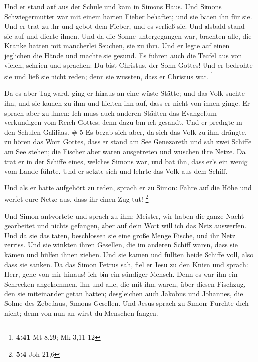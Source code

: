  Und er stand auf aus der Schule und kam in Simons Haus.
Und Simons Schwiegermutter war mit einem harten Fieber behaftet; und sie
baten ihn für sie.  Und er trat zu ihr und gebot dem
Fieber, und es verließ sie. Und alsbald stand sie auf und diente ihnen.
 Und da die Sonne untergegangen war, brachten alle, die
Kranke hatten mit mancherlei Seuchen, sie zu ihm. Und er legte auf einen
jeglichen die Hände und machte sie gesund.  Es fuhren
auch die Teufel aus von vielen, schrien und sprachen: Du bist Christus,
der Sohn Gottes! Und er bedrohte sie und ließ sie nicht reden; denn sie
wussten, dass er Christus war. \footnote{\textbf{4:41} Mt 8,29; Mk
  3,11-12}

 Da es aber Tag ward, ging er hinaus an eine wüste
Stätte; und das Volk suchte ihn, und sie kamen zu ihm und hielten ihn
auf, dass er nicht von ihnen ginge.  Er sprach aber zu
ihnen: Ich muss auch anderen Städten das Evangelium verkündigen vom
Reich Gottes; denn dazu bin ich gesandt.  Und er predigte
in den Schulen Galiläas. \# 5  Es begab sich aber, da sich
das Volk zu ihm drängte, zu hören das Wort Gottes, dass er stand am See
Genezareth  und sah zwei Schiffe am See stehen; die
Fischer aber waren ausgetreten und wuschen ihre Netze.  Da
trat er in der Schiffe eines, welches Simons war, und bat ihn, dass er's
ein wenig vom Lande führte. Und er setzte sich und lehrte das Volk aus
dem Schiff.

 Und als er hatte aufgehört zu reden, sprach er zu Simon:
Fahre auf die Höhe und werfet eure Netze aus, dass ihr einen Zug tut!
\footnote{\textbf{5:4} Joh 21,6}

 Und Simon antwortete und sprach zu ihm: Meister, wir
haben die ganze Nacht gearbeitet und nichts gefangen, aber auf dein Wort
will ich das Netz auswerfen.  Und da sie das taten,
beschlossen sie eine große Menge Fische, und ihr Netz zerriss.
 Und sie winkten ihren Gesellen, die im anderen Schiff
waren, dass sie kämen und hülfen ihnen ziehen. Und sie kamen und füllten
beide Schiffe voll, also dass sie sanken.  Da das Simon
Petrus sah, fiel er Jesu zu den Knien und sprach: Herr, gehe von mir
hinaus! ich bin ein sündiger Mensch.  Denn es war ihn ein
Schrecken angekommen, ihn und alle, die mit ihm waren, über diesen
Fischzug, den sie miteinander getan hatten;  desgleichen
auch Jakobus und Johannes, die Söhne des Zebedäus, Simons Gesellen. Und
Jesus sprach zu Simon: Fürchte dich nicht; denn von nun an wirst du
Menschen fangen.

